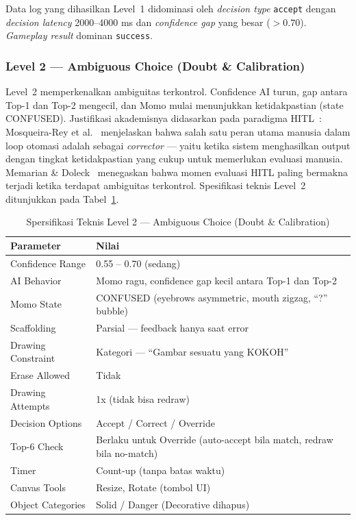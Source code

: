 \documentclass[12pt,a4paper,oneside,openany]{report}
\begin{document}
Data log yang dihasilkan Level~1 didominasi oleh \textit{decision type} \texttt{accept} dengan \textit{decision latency} 2000--4000 ms dan \textit{confidence gap} yang besar ($>0.70$). \textit{Gameplay result} dominan \texttt{success}.

\subsubsection{Level 2 --- Ambiguous Choice (Doubt \& Calibration)}

Level~2 memperkenalkan ambiguitas terkontrol. Confidence AI turun, gap antara Top-1 dan Top-2 mengecil, dan Momo mulai menunjukkan ketidakpastian (state CONFUSED). Justifikasi akademisnya didasarkan pada paradigma HITL~\cite{ref4}\cite{ref5}: Mosqueira-Rey et al.~\cite{ref4} menjelaskan bahwa salah satu peran utama manusia dalam loop otomasi adalah sebagai \textit{corrector} --- yaitu ketika sistem menghasilkan output dengan tingkat ketidakpastian yang cukup untuk memerlukan evaluasi manusia. Memarian \& Doleck~\cite{ref5} menegaskan bahwa momen evaluasi HITL paling bermakna terjadi ketika terdapat ambiguitas terkontrol. Spesifikasi teknis Level~2 ditunjukkan pada Tabel~\ref{tab:level2-spec}.

\begin{table}[H]
\centering
\caption{Spersifikasi Teknis Level 2 --- Ambiguous Choice (Doubt \& Calibration)}
\label{tab:level2-spec}
\begin{tabular}{|l|l|}
\hline
\textbf{Parameter} & \textbf{Nilai} \\ \hline
Confidence Range & 0.55 -- 0.70 (sedang) \\ \hline
AI Behavior & Momo ragu, confidence gap kecil antara Top-1 dan Top-2 \\ \hline
Momo State & CONFUSED (eyebrows asymmetric, mouth zigzag, ``?'' bubble) \\ \hline
Scaffolding & Parsial --- feedback hanya saat error \\ \hline
Drawing Constraint & Kategori --- ``Gambar sesuatu yang KOKOH'' \\ \hline
Erase Allowed & Tidak \\ \hline
Drawing Attempts & 1x (tidak bisa redraw) \\ \hline
Decision Options & Accept / Correct / Override \\ \hline
Top-6 Check & Berlaku untuk Override (auto-accept bila match, redraw bila no-match) \\ \hline
Timer & Count-up (tanpa batas waktu) \\ \hline
Canvas Tools & Resize, Rotate (tombol UI) \\ \hline
Object Categories & Solid / Danger (Decorative dihapus) \\ \hline
\end{tabular}
\end{table}
\end{document}
